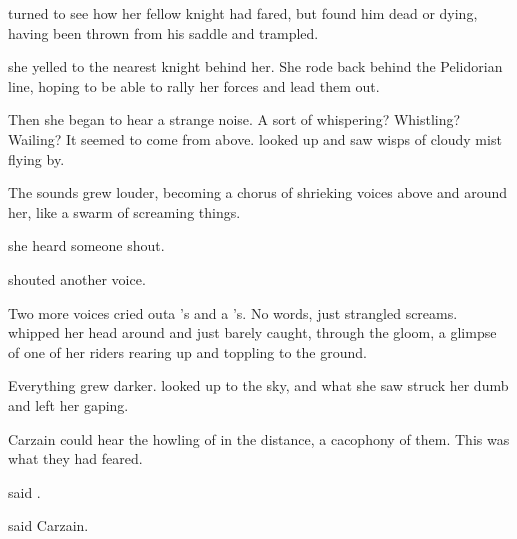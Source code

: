 \Dornaer turned to see how her fellow knight had fared, but found him dead or dying, having been thrown from his saddle and trampled. 


 she yelled to the nearest knight behind her.
She rode back behind the Pelidorian line, hoping to be able to rally her forces and lead them out. 

Then she began to hear a strange noise. 
A sort of whispering?
Whistling? 
Wailing? 
It seemed to come from above. 
\Dornaer looked up and saw wisps of cloudy mist flying by.

The sounds grew louder, becoming a chorus of shrieking voices above and around her, like a swarm of screaming things. 

 she heard someone shout. 

 shouted another voice. 

Two more voices cried out\dash a \scatha's and a \relc's. 
No words, just strangled screams.
\Dornaer whipped her head around and just barely caught, through the gloom, a glimpse of one of her riders rearing up and toppling to the ground. 

Everything grew darker.
\Dornaer looked up to the sky, and what she saw struck her dumb and left her gaping. 





\begin{comment}
  \subsection{Sanyor sneaks off}
\end{comment}
Carzain could hear the howling of \daimonia in the distance, a cacophony of them. 
This was what they had feared. 

 said \Sanyor.

 said Carzain. 

